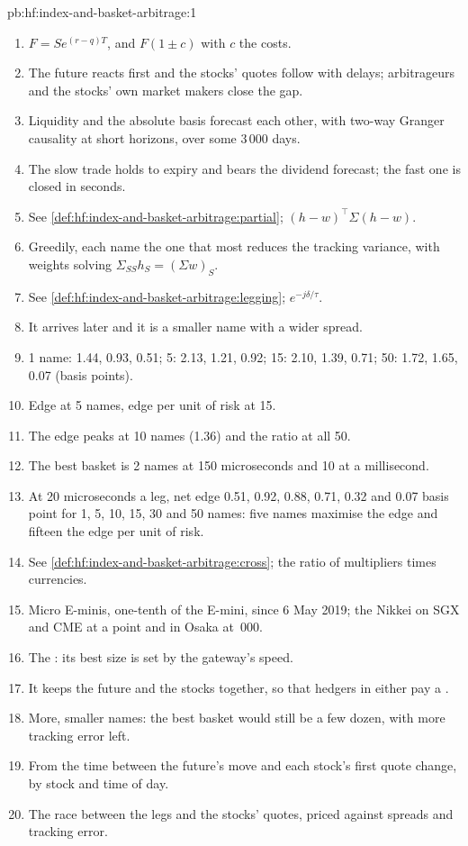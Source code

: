 \begin{solution}{pb:hf:index-and-basket-arbitrage:1}
\begin{enumerate}
\item $F=Se^{(r-q)T}$, and $F(1\pm c)$ with $c$ the costs.
\item The future reacts first and the stocks' quotes follow with delays; arbitrageurs and the stocks' own market makers close the gap.
\item Liquidity and the absolute basis forecast each other, with two-way Granger causality at short horizons, over some 3\,000 days.
\item The slow trade holds to expiry and bears the dividend forecast; the fast one is closed in seconds.
\item See \cref{def:hf:index-and-basket-arbitrage:partial}; $(h-w)^\top\Sigma(h-w)$.
\item Greedily, each name the one that most reduces the tracking variance, with weights solving $\Sigma_{SS}h_S=(\Sigma w)_S$.
\item See \cref{def:hf:index-and-basket-arbitrage:legging}; $e^{-j\delta/\tau}$.
\item It arrives later and it is a smaller name with a wider spread.
\item 1 name: 1.44, 0.93, 0.51; 5: 2.13, 1.21, 0.92; 15: 2.10, 1.39, 0.71; 50: 1.72, 1.65, 0.07 (basis points).
\item Edge at 5 names, edge per unit of risk at 15.
\item The edge peaks at 10 names (1.36) and the ratio at all 50.
\item The best basket is 2 names at 150 microseconds and 10 at a millisecond.
\item At 20 microseconds a leg, net edge 0.51, 0.92, 0.88, 0.71, 0.32 and 0.07 basis point for 1, 5, 10, 15, 30 and 50 names: five names maximise
the edge and fifteen the edge per unit of risk.
\item See \cref{def:hf:index-and-basket-arbitrage:cross}; the ratio of multipliers times currencies.
\item Micro E-minis, one-tenth of the E-mini, since 6 May 2019; the Nikkei on SGX and CME at  a point and in Osaka at \,000.
\item The : its best size is set by the gateway's speed.
\item It keeps the future and the stocks together, so that hedgers in either pay a .
\item More, smaller names: the best basket would still be a few dozen, with more tracking error left.
\item From the time between the future's move and each stock's first quote change, by stock and time of day.
\item The race between the legs and the stocks' quotes, priced against spreads and tracking error.
\end{enumerate}
\end{solution}

